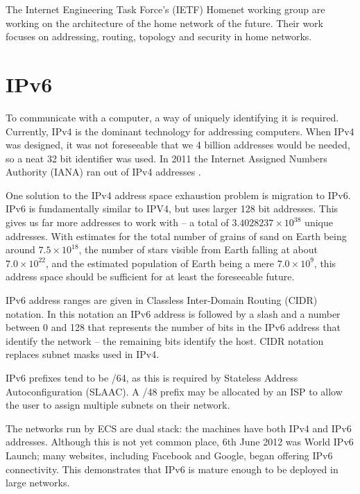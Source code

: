\documentclass[12pt,a4paper,twoside]{report}
\begin{document}
The Internet Engineering Task Force's (IETF) Homenet working group
\cite{homenet} are working on the architecture of the home network of the
future. Their work focuses on addressing, routing, topology and security
in home networks. 

\section{IPv6}
To communicate with a computer, a way of uniquely identifying it is required.
Currently, IPv4 is the dominant technology for addressing computers. When IPv4
was designed, it was not foreseeable that we 4 billion addresses would be
needed, so a neat 32 bit identifier was used.  In 2011 the Internet Assigned
Numbers Authority (IANA)  ran out of IPv4 addresses \cite{potaroo}. 

One solution to the IPv4 address space exhaustion problem is migration to IPv6.
IPv6 is fundamentally similar to IPV4, but uses larger 128 bit addresses. This
gives us far more addresses to work with -- a total of $3.4028237\times10^{38}$
unique addresses. With estimates for the total number of grains of sand on
Earth being around $7.5\times10^{18}$, the number of stars visible from Earth
falling at about $7.0\times10^{22}$, and the estimated population of Earth
being a mere $7.0\times10^{9}$, this address space should be sufficient for at
least the foreseeable future. 

IPv6 address ranges are given in Classless Inter-Domain Routing (CIDR)
 notation. In this notation
an IPv6 address is followed by a slash and a number between 0 and 128 that
represents the number of bits in the IPv6 address that identify the network --
the remaining bits identify the host. CIDR notation replaces subnet masks used
in IPv4.

IPv6 prefixes tend to be /64, as this is required by Stateless Address
Autoconfiguration (SLAAC). A /48 prefix may be allocated by an ISP to allow the user
to assign multiple subnets on their network.

The networks run by ECS are dual stack: the machines have both IPv4 and IPv6
addresses. Although this is not yet common place, 6th June 2012 was World IPv6
Launch; many websites, including Facebook and Google, began offering IPv6
connectivity. \cite{IPv6Launch} This demonstrates that IPv6 is mature enough to
be deployed in large networks.
\end{document}
